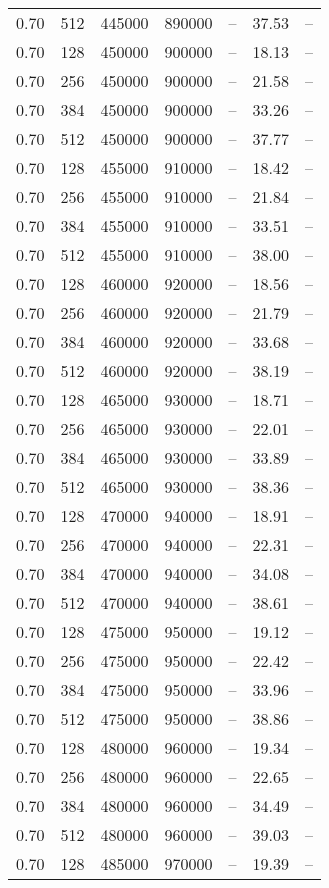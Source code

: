 \begin{tabular}{l|l|l|l|l|l|l}
0.70 & 512 & 445000 & 890000 & -- & 37.53 & --\\
0.70 & 128 & 450000 & 900000 & -- & 18.13 & --\\
0.70 & 256 & 450000 & 900000 & -- & 21.58 & --\\
0.70 & 384 & 450000 & 900000 & -- & 33.26 & --\\
0.70 & 512 & 450000 & 900000 & -- & 37.77 & --\\
0.70 & 128 & 455000 & 910000 & -- & 18.42 & --\\
0.70 & 256 & 455000 & 910000 & -- & 21.84 & --\\
0.70 & 384 & 455000 & 910000 & -- & 33.51 & --\\
0.70 & 512 & 455000 & 910000 & -- & 38.00 & --\\
0.70 & 128 & 460000 & 920000 & -- & 18.56 & --\\
0.70 & 256 & 460000 & 920000 & -- & 21.79 & --\\
0.70 & 384 & 460000 & 920000 & -- & 33.68 & --\\
0.70 & 512 & 460000 & 920000 & -- & 38.19 & --\\
0.70 & 128 & 465000 & 930000 & -- & 18.71 & --\\
0.70 & 256 & 465000 & 930000 & -- & 22.01 & --\\
0.70 & 384 & 465000 & 930000 & -- & 33.89 & --\\
0.70 & 512 & 465000 & 930000 & -- & 38.36 & --\\
0.70 & 128 & 470000 & 940000 & -- & 18.91 & --\\
0.70 & 256 & 470000 & 940000 & -- & 22.31 & --\\
0.70 & 384 & 470000 & 940000 & -- & 34.08 & --\\
0.70 & 512 & 470000 & 940000 & -- & 38.61 & --\\
0.70 & 128 & 475000 & 950000 & -- & 19.12 & --\\
0.70 & 256 & 475000 & 950000 & -- & 22.42 & --\\
0.70 & 384 & 475000 & 950000 & -- & 33.96 & --\\
0.70 & 512 & 475000 & 950000 & -- & 38.86 & --\\
0.70 & 128 & 480000 & 960000 & -- & 19.34 & --\\
0.70 & 256 & 480000 & 960000 & -- & 22.65 & --\\
0.70 & 384 & 480000 & 960000 & -- & 34.49 & --\\
0.70 & 512 & 480000 & 960000 & -- & 39.03 & --\\
0.70 & 128 & 485000 & 970000 & -- & 19.39 & --\\

\end{tabular}
